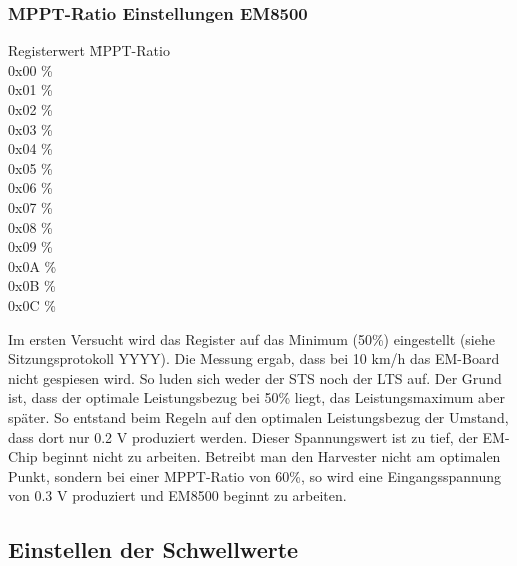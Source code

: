 \subsubsection*{MPPT-Ratio Einstellungen EM8500}
\begin{tabbing}
    Registerwert   \quad\= MPPT-Ratio    \\[0.8ex]
    0x00           \thinspace\% \\
    0x01           \thinspace\%\\
    0x02           \thinspace\%\\
    0x03           \thinspace\%\\
    0x04           \thinspace\%\\
    0x05           \thinspace\%\\
    0x06           \thinspace\% \\
    0x07           \thinspace\%\\
    0x08           \thinspace\%\\
    0x09           \thinspace\%\\
    0x0A           \thinspace\% \\
    0x0B           \thinspace\%\\
    0x0C           \thinspace\%\\
\end{tabbing}

Im ersten Versucht wird das Register auf das Minimum (50\thinspace\%) eingestellt (siehe Sitzungsprotokoll YYYY). Die Messung ergab, dass bei 10 km/h das EM-Board nicht gespiesen wird. So luden sich weder der STS noch der LTS auf. Der Grund ist, dass der optimale Leistungsbezug bei 50\thinspace\% liegt, das Leistungsmaximum aber später. So entstand beim Regeln auf den optimalen Leistungsbezug der Umstand, dass dort nur 0.2 V produziert werden. Dieser Spannungswert ist zu tief, der EM-Chip beginnt nicht zu arbeiten. Betreibt man den Harvester nicht am optimalen Punkt, sondern bei einer MPPT-Ratio von 60\thinspace\%, so wird eine Eingangsspannung von 0.3 V produziert und EM8500 beginnt zu arbeiten.




\subsection{Einstellen der Schwellwerte}
\label{v_schwellwerte}

